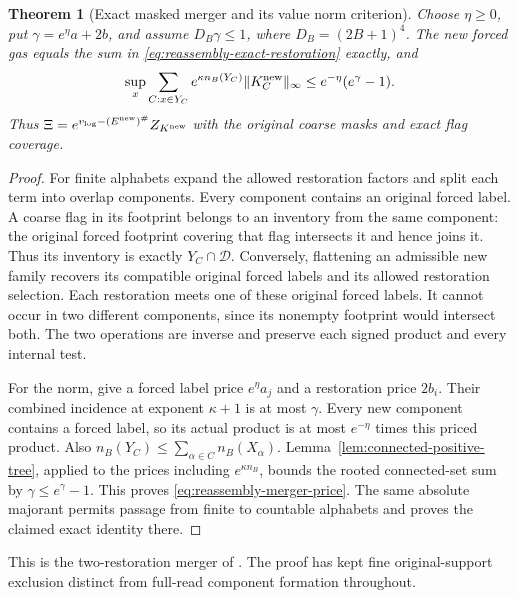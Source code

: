 \documentclass[11pt,reqno]{amsart}
\numberwithin{equation}{section}
\newtheorem{theorem}{Theorem}[section]
\theoremstyle{definition}
\theoremstyle{remark}
\begin{document}
\begin{theorem}[Exact masked merger and its value norm criterion]
\label{thm:reassembly-exact-merger}
Choose \(\eta\ge0\), put \(\gamma=e^\eta a+2b\), and assume
\(D_B\gamma\le1\), where \(D_B=(2B+1)^4\).
The new forced gas equals the sum in
\eqref{eq:reassembly-exact-restoration} exactly, and
\begin{equation}
 \sup_x\sum_{C:x\in Y_C}e^{\kappa n_B(Y_C)}\|K_C^{\rm new}\|_\infty
                              \le e^{-\eta}(e^\gamma-1).
 \label{eq:reassembly-merger-price}
\end{equation}
Thus \(\Xi=e^{v_{\rm log}-(E^{\rm new})^\#}Z_{K^{\rm new}}\)
with the original coarse masks and exact flag coverage.
\end{theorem}
\begin{proof}
For finite alphabets expand the allowed restoration factors and
split each term into overlap components. Every component contains
an original forced label. A coarse flag in its footprint belongs
to an inventory from the same component: the original forced
footprint covering that flag intersects it and hence joins it.
Thus its inventory is exactly \(Y_C\cap\mathcal D\).
Conversely, flattening an admissible new family recovers its
compatible original forced labels and its allowed restoration
selection. Each restoration meets one of these original forced
labels. It cannot occur in two different components, since its
nonempty footprint would intersect both. The two operations are
inverse and preserve each signed product and every internal test.

For the norm, give a forced label price \(e^\eta a_j\) and
a restoration price \(2b_i\). Their combined incidence at
exponent \(\kappa+1\) is at most \(\gamma\).
Every new component contains a forced label, so its actual product
is at most \(e^{-\eta}\) times this priced product.
Also \(n_B(Y_C)\le\sum_{\alpha\in C}n_B(X_\alpha)\).
Lemma~\ref{lem:connected-positive-tree}, applied to the prices
including \(e^{\kappa n_B}\), bounds the rooted connected-set
sum by \(\gamma\le e^\gamma-1\). This proves
\eqref{eq:reassembly-merger-price}. The same absolute majorant
permits passage from finite to countable alphabets and proves
the claimed exact identity there.
\end{proof}

This is the two-restoration merger of
\cite[Proposition~29.3 and Theorem~29.4, pp.~164--165]{Main}.
The proof has kept fine original-support exclusion distinct from
full-read component formation throughout.
\end{document}
